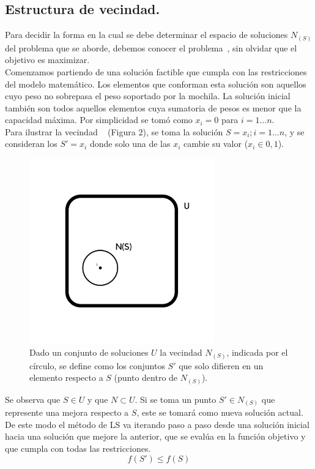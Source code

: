 \documentclass{ci5652}
\begin{document}
	\subsection{Estructura de vecindad.}
		Para decidir la forma en la cual se debe determinar el espacio de soluciones $N_{(S)}$ del problema que se aborde, debemos conocer el problema~\cite{c_KP_02}, sin olvidar que el objetivo es maximizar.\\
		Comenzamos partiendo de una solución factible que cumpla con las restricciones del modelo matemático. Los elementos que conforman esta solución son aquellos cuyo peso no sobrepasa el peso soportado por la mochila. La solución inicial también son todos aquellos elementos cuya sumatoria de pesos es menor que la capacidad máxima. Por simplicidad se tomó como $x_i = 0$ para $i = 1\ldots n$.\\
		Para ilustrar la vecindad ~\cite{c_KP_03} (Figura 2), se toma la solución $S = {x_i};i =1\ldots n$, y se consideran los $S'={x_i}$ donde solo una de las $x_i$ cambie su valor ($x_i \in {0,1}$).

	 	\begin{figure}[h]
		 	\caption{Dado un conjunto de soluciones $U$ la vecindad $N_{(S)}$, indicada por el círculo, se define como los conjuntos $S'$ que solo difieren en un elemento respecto a $S$ (punto dentro de $N_{(S)}$).}
			\includegraphics[width=8cm, height=8cm]{Vecindad.png}
		\end{figure}

		Se observa que $S \in U$ y que $N \subset U$. Si se toma un punto $S' \in N_{(S)}$ que represente una mejora respecto a $S$, este se tomará como nueva solución actual. De este modo el método de LS va iterando paso a paso desde una solución inicial hacia una solución que mejore la anterior, que se evalúa en la función objetivo y que cumpla con todas las restricciones.
		$$
		f(S') \leq f(S)
		$$
\end{document}
